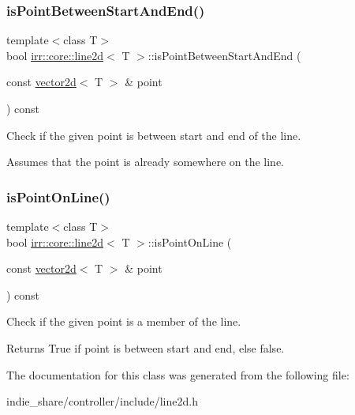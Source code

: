 \subsubsection{\texorpdfstring{is\+Point\+Between\+Start\+And\+End()}{isPointBetweenStartAndEnd()}}
{\footnotesize\ttfamily template$<$class T$>$ \\
bool \hyperlink{classirr_1_1core_1_1line2d}{irr\+::core\+::line2d}$<$ T $>$\+::is\+Point\+Between\+Start\+And\+End (\begin{DoxyParamCaption}\item[{const \hyperlink{classirr_1_1core_1_1vector2d}{vector2d}$<$ T $>$ \&}]{point }\end{DoxyParamCaption}) const\hspace{0.3cm}{\ttfamily [inline]}}



Check if the given point is between start and end of the line. 

Assumes that the point is already somewhere on the line. \mbox{\label{classirr_1_1core_1_1line2d_a00fcd43ae43b8b7e249b32206aaa22ff}} 
\subsubsection{\texorpdfstring{is\+Point\+On\+Line()}{isPointOnLine()}}
{\footnotesize\ttfamily template$<$class T$>$ \\
bool \hyperlink{classirr_1_1core_1_1line2d}{irr\+::core\+::line2d}$<$ T $>$\+::is\+Point\+On\+Line (\begin{DoxyParamCaption}\item[{const \hyperlink{classirr_1_1core_1_1vector2d}{vector2d}$<$ T $>$ \&}]{point }\end{DoxyParamCaption}) const\hspace{0.3cm}{\ttfamily [inline]}}



Check if the given point is a member of the line. 

\begin{DoxyReturn}{Returns}
True if point is between start and end, else false. 
\end{DoxyReturn}


The documentation for this class was generated from the following file\+:\begin{DoxyCompactItemize}
\item 
indie\+\_\+share/controller/include/line2d.\+h\end{DoxyCompactItemize}
